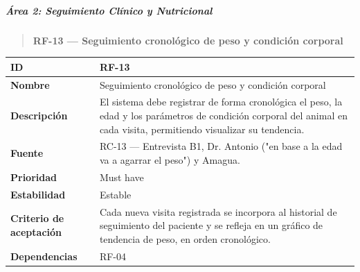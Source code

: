 \subparagraph{Área 2: Seguimiento Clínico y
Nutricional}\label{uxe1rea-2-seguimiento-cluxednico-y-nutricional}

\begin{quote}
\textbf{RF-13 --- Seguimiento cronológico de peso y condición corporal}
\end{quote}

{\def\LTcaptype{none} %
\begin{longtable}[]{@{}
  >{\raggedright\arraybackslash}p{}
  >{\raggedright\arraybackslash}p{}@{}}
\toprule\noalign{}
\begin{minipage}[b]{\linewidth}\raggedright
\textbf{ID}
\end{minipage} & \begin{minipage}[b]{\linewidth}\raggedright
RF-13
\end{minipage} \\
\midrule\noalign{}
\endhead
\bottomrule\noalign{}
\endlastfoot
\textbf{Nombre} & \begin{minipage}[t]{\linewidth}\raggedright
Seguimiento cronológico de peso y condición corporal
\end{minipage} \\
\textbf{Descripción} & \begin{minipage}[t]{\linewidth}\raggedright
El sistema debe registrar de forma cronológica el peso, la edad y los
parámetros de condición corporal del animal en cada visita, permitiendo
visualizar su tendencia.
\end{minipage} \\
\textbf{Fuente} & \begin{minipage}[t]{\linewidth}\raggedright
RC-13 --- Entrevista B1, Dr. Antonio ("en base a la edad va a agarrar el
peso") y Amagua.
\end{minipage} \\
\textbf{Prioridad} & \begin{minipage}[t]{\linewidth}\raggedright
Must have
\end{minipage} \\
\textbf{Estabilidad} & \begin{minipage}[t]{\linewidth}\raggedright
Estable
\end{minipage} \\
\textbf{Criterio de aceptación} &
\begin{minipage}[t]{\linewidth}\raggedright
Cada nueva visita registrada se incorpora al historial de seguimiento
del paciente y se refleja en un gráfico de tendencia de peso, en orden
cronológico.
\end{minipage} \\
\textbf{Dependencias} & \begin{minipage}[t]{\linewidth}\raggedright
RF-04
\end{minipage} \\
\end{longtable}
}

